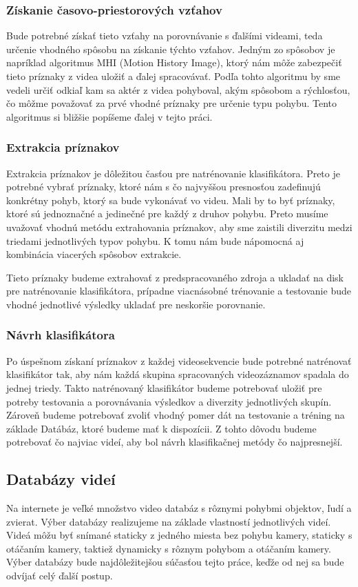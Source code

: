 \subsubsection{Získanie časovo-priestorových vzťahov}
Bude potrebné získať tieto vzťahy na porovnávanie s ďalšími videami, teda určenie vhodného spôsobu na získanie týchto vzťahov. Jedným zo spôsobov je napríklad algoritmus MHI (Motion History Image), ktorý nám môže zabezpečiť tieto príznaky z videa uložiť a ďalej spracovávať. Podľa tohto algoritmu by sme vedeli určiť odkiaľ kam sa aktér z videa pohyboval, akým spôsobom a rýchlosťou, čo môžme považovať za prvé vhodné príznaky pre určenie typu pohybu.\cite{c3} Tento algoritmus si bližšie popíšeme ďalej v tejto práci.

\subsubsection{Extrakcia príznakov}
Extrakcia príznakov je dôležitou časťou pre natrénovanie klasifikátora. Preto je potrebné vybrať príznaky, ktoré nám s čo najvyššou presnosťou zadefinujú konkrétny pohyb, ktorý sa bude vykonávať vo videu. Mali by to byť príznaky, ktoré sú jednoznačné a jedinečné pre každý z druhov pohybu. Preto musíme uvažovať vhodnú metódu extrahovania príznakov, aby sme zaistili diverzitu medzi triedami jednotlivých typov pohybu. K tomu nám bude nápomocná aj kombinácia viacerých spôsobov extrakcie. 

Tieto príznaky budeme extrahovať z predspracovaného zdroja a ukladať na disk pre natrénovanie klasifikátora, prípadne viacnásobné trénovanie a testovanie bude vhodné jednotlivé výsledky ukladať pre neskoršie porovnanie.

\subsubsection{Návrh klasifikátora}
Po úspešnom získaní príznakov z každej videosekvencie bude potrebné natrénovať klasifikátor tak, aby nám každá skupina spracovaných videozáznamov spadala do jednej triedy. Takto natrénovaný klasifikátor budeme potrebovať uložiť pre potreby testovania a porovnávania výsledkov a diverzity jednotlivých skupín. Zároveň budeme potrebovať zvoliť vhodný pomer dát na testovanie a tréning na základe Datábáz, ktoré budeme mať k dispozícii. Z tohto dôvodu budeme potrebovať čo najviac videí, aby bol návrh klasifikačnej metódy čo najpresnejší.


\subsection{Databázy videí}
Na internete je veľké množstvo video databáz s rôznymi pohybmi objektov, ľudí a zvierat.
Výber databázy realizujeme na základe vlastností jednotlivých videí. Videá môžu byť snímané staticky z jedného miesta bez pohybu kamery, staticky s otáčaním kamery, taktiež dynamicky s rôznym pohybom a otáčaním kamery. Výber databázy bude najdôležitejšou súčasťou tejto práce, keďže od nej sa bude odvíjať celý ďalší postup.
